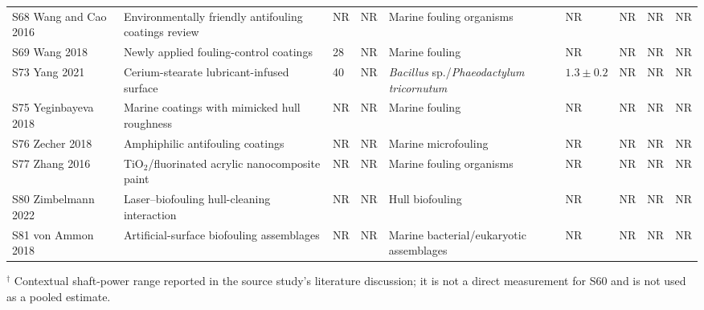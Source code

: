 \begin{table}[t]
{\begin{tabular}{l l l l l l l l l}
S68 Wang and Cao 2016 & Environmentally friendly antifouling coatings review & NR & NR & Marine fouling organisms & NR & NR & NR & NR \\
S69 Wang 2018 & Newly applied fouling-control coatings & 28 & NR & Marine fouling & NR & NR & NR & NR \\
S73 Yang 2021 & Cerium-stearate lubricant-infused surface & 40 & NR & \textit{Bacillus} sp./\textit{Phaeodactylum tricornutum} & $1.3\pm0.2$ & NR & NR & NR \\
S75 Yeginbayeva 2018 & Marine coatings with mimicked hull roughness & NR & NR & Marine fouling & NR & NR & NR & NR \\
S76 Zecher 2018 & Amphiphilic antifouling coatings & NR & NR & Marine microfouling & NR & NR & NR & NR \\
S77 Zhang 2016 & TiO$_2$/fluorinated acrylic nanocomposite paint & NR & NR & Marine fouling organisms & NR & NR & NR & NR \\
S80 Zimbelmann 2022 & Laser--biofouling hull-cleaning interaction & NR & NR & Hull biofouling & NR & NR & NR & NR \\
S81 von Ammon 2018 & Artificial-surface biofouling assemblages & NR & NR & Marine bacterial/eukaryotic assemblages & NR & NR & NR & NR \\
\bottomrule
\end{tabular}%
}
\vspace{1mm}
\parbox{\textwidth}{\scriptsize $^\dagger$ Contextual shaft-power range reported in the source study's literature discussion; it is not a direct measurement for S60 and is not used as a pooled estimate.}
\end{table}
